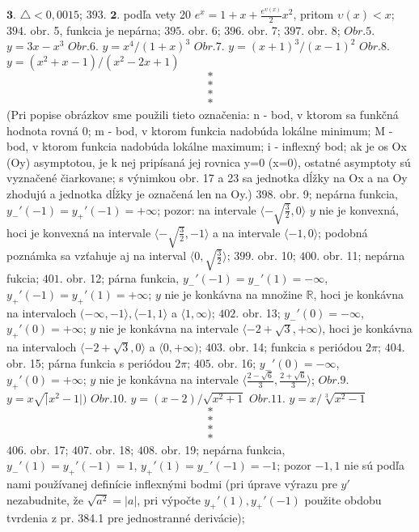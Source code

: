 $\boldsymbol{3.}$ $\bigtriangleup < 0,0015$;
$\boxed{393.}$ $\boldsymbol{2.}$ podľa vety 20 $e^{x}=1+x+\frac{e^{\upsilon (x)}}{2}x^{2}$, pritom $\upsilon (x)<x$;
$\boxed{394.}$ obr. 5, funkcia je nepárna;
$\boxed{395.}$ obr. 6;
$\boxed{396.}$ obr. 7;
$\boxed{397.}$ obr. 8;
$\boxed{Obr.5.}$  $y=3x-x^{3}$
$\boxed{Obr.6.}$  $y=x^{4}/(1+x)^{3}$
$\boxed{Obr.7.}$  $y=(x+1)^{3}/(x-1)^{2}$
$\boxed{Obr.8.}$  $y=(x^{2}+x-1)/(x^{2}-2x+1)$
$$*$$
$$*$$
$$*$$
$$*$$
(Pri popise obrázkov sme použili tieto označenia: n - bod, v ktorom sa funkčná hodnota rovná 0; m - bod, v ktorom funkcia nadobúda lokálne minimum; M - bod, v ktorom funkcia nadobúda lokálne maximum; i - inflexný bod; ak je os Ox (Oy) asymptotou, je k nej pripísaná jej rovnica y=0 (x=0), ostatné asymptoty sú vyznačené čiarkovane; s výnimkou obr. 17 a 23 sa jednotka dĺžky na Ox a na Oy zhodujú a jednotka dĺžky je označená len na Oy.)
$\boxed{398.}$ obr. 9; nepárna funkcia, $y_{-}'(-1)=y_{+}'(-1)=+\infty $; pozor: na intervale $\langle -\sqrt{\frac{3}{2}},0 \rangle$ $y$ nie je konvexná, hoci je konvexná na intervale $\langle -\sqrt{\frac{3}{2}},-1 \rangle$ a na intervale $\langle -1,0 \rangle$; podobná poznámka sa vzťahuje aj na interval $\langle 0,\sqrt{\frac{3}{2}} \rangle$;
$\boxed{399.}$ obr. 10; 
$\boxed{400.}$ obr. 11;	 nepárna fukcia;
$\boxed{401.}$ obr. 12;  párna funkcia, $y_{-}'(-1)=y_{-}'(1)=-\infty $, $y_{+}'(-1)=y_{+}'(1)=+\infty $; $y$ nie je konkávna na množine $\mathbb{R}$, hoci je konkávna na intervaloch $(-\infty ,-1\rangle , \langle -1,1 \rangle $ a $\langle 1, \infty)$;
$\boxed{402.}$ obr. 13;  $y_{-}'(0)=-\infty $, $y_{+}'(0)=+\infty $; $y$ nie je konkávna na intervale $\langle -2+\sqrt{3}, +\infty)$, hoci je konkávna na intervaloch $\langle -2+\sqrt{3},0 \rangle$ a $\langle 0,+\infty)$;
$\boxed{403.}$ obr. 14; funkcia s periódou $2\pi$;
$\boxed{404.}$ obr. 15; párna funkcia s periódou $2\pi$;
$\boxed{405.}$ obr. 16; $y_{-}'(0)=-\infty $, $y_{+}'(0)=+\infty $; $y$ nie je konkávna na intervale $\langle \frac{2-\sqrt{6}}{3},\frac{2+\sqrt{6}}{3} \rangle$;
$\boxed{Obr.9.}$  $y=x \sqrt{\vert}x^{2}-1 \vert)$
$\boxed{Obr.10.}$  $y=(x-2)/\sqrt{x^{2}+1}$
$\boxed{Obr.11.}$  $y=x/\sqrt[3]{x^{2}-1}$
$$*$$
$$*$$
$$*$$
$$*$$
$\boxed{406.}$ obr. 17;
$\boxed{407.}$ obr. 18;
$\boxed{408.}$ obr. 19; nepárna funkcia,  $y_{-}'(1)=y_{+}'(-1)=1 $,  $y_{+}'(1)=y_{-}'(-1)=-1 $; pozor $-1,1$ nie sú podľa nami používanej definície inflexnými bodmi (pri úprave výrazu pre $y'$ nezabudnite, že  $\sqrt{a^{2}}=\vert a \vert $, pri výpočte $y_{+}'(1),y_{+}'(-1)$ použite obdobu tvrdenia z pr. 384.1 pre jednostranné derivácie);
